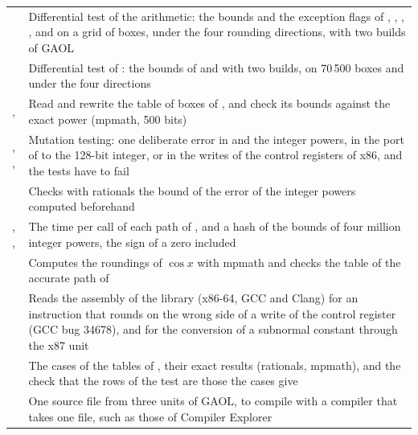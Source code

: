 \documentclass[12pt,a4paper,twoside,openright]{book}
\begin{document}
\begin{longtable}{L{5cm}L{8.8cm}}
  \hline
   & Differential test of the arithmetic:
    the bounds and the exception flags of \code{+ - * / \%}, ,
    , ,  and  on a grid of
    boxes, under the four rounding directions, with two builds of GAOL\\
   & Differential test of : the bounds
    of  and  with two builds, on
    70\,500 boxes and under the four directions\\
  ,  & Read and
    rewrite the table of boxes of , and check its bounds
    against the exact power (mpmath, 500 bits)\\
  , ,
     & Mutation testing: one deliberate error
    in  and the integer powers, in the port of  to the
    128-bit integer, or in the writes of the control registers of x86, and
    the tests have to fail\\
   & Checks with rationals the bound of the
    error of the integer powers computed beforehand\\
  , ,
     & The time per call of each path of
    , and a hash of the bounds of four million integer powers, the
    sign of a zero included\\
   & Computes the roundings of
    $\cos x$ with mpmath and checks the table of the accurate path of
    \\
   & Reads the assembly of the library
    (x86-64, GCC and Clang) for an instruction that rounds on the wrong side
    of a write of the control register (GCC bug 34678), and for the
    conversion of a subnormal constant through the x87 unit\\
   & The cases of the tables of
    , their exact results (rationals, mpmath), and
    the check that the rows of the test are those the cases give\\
   & One source file from three units of
    GAOL, to compile with a compiler that takes one file, such as those of
    Compiler Explorer\\
\end{longtable}
\endgroup
\end{document}
